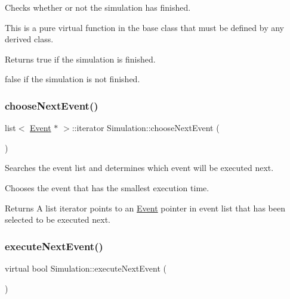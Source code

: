 Checks whether or not the simulation has finished. 

This is a pure virtual function in the base class that must be defined by any derived class. \begin{DoxyReturn}{Returns}
true if the simulation is finished. 

false if the simulation is not finished. 
\end{DoxyReturn}
\mbox{\label{class_simulation_a401d40509ba367a28702873a0d65188d}} 
\subsubsection{\texorpdfstring{choose\+Next\+Event()}{chooseNextEvent()}}
{\footnotesize\ttfamily list$<$ \hyperlink{class_event}{Event} $\ast$ $>$\+::iterator Simulation\+::choose\+Next\+Event (\begin{DoxyParamCaption}{ }\end{DoxyParamCaption})\hspace{0.3cm}{\ttfamily [protected]}}



Searches the event list and determines which event will be executed next. 

Chooses the event that has the smallest execution time. \begin{DoxyReturn}{Returns}
A list iterator points to an \hyperlink{class_event}{Event} pointer in event list that has been selected to be executed next. 
\end{DoxyReturn}
\mbox{\label{class_simulation_a48e9e82f9dac1acec5d063a9f6f6115e}} 
\subsubsection{\texorpdfstring{execute\+Next\+Event()}{executeNextEvent()}}
{\footnotesize\ttfamily virtual bool Simulation\+::execute\+Next\+Event (\begin{DoxyParamCaption}{ }\end{DoxyParamCaption})\hspace{0.3cm}{\ttfamily [pure virtual]}}



